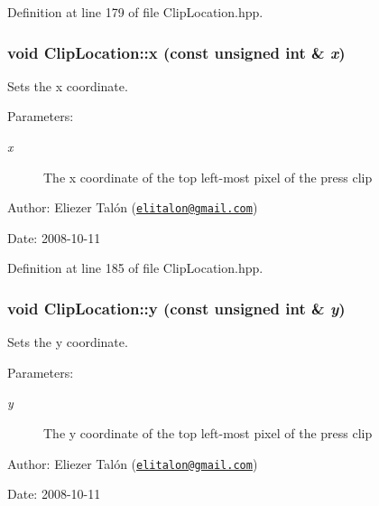 Definition at line 179 of file ClipLocation.hpp.\hypertarget{class_clip_location_f983f4cfe6ad80aa96cbbb4b53aec968}{
\subsubsection[x]{\setlength{\rightskip}{0pt plus 5cm}void ClipLocation::x (const unsigned int \& {\em x})}}
\label{class_clip_location_f983f4cfe6ad80aa96cbbb4b53aec968}


Sets the x coordinate. 

\begin{Desc}
\item[Parameters:]
\begin{description}
\item[{\em x}]The x coordinate of the top left-most pixel of the press clip\end{description}
\end{Desc}
\begin{Desc}
\item[Author:]Eliezer Talón (\href{mailto:elitalon@gmail.com}{\tt elitalon@gmail.com}) \end{Desc}
\begin{Desc}
\item[Date:]2008-10-11 \end{Desc}


Definition at line 185 of file ClipLocation.hpp.\hypertarget{class_clip_location_3c665324e5faf6bae4013d936f0ce2dc}{
\subsubsection[y]{\setlength{\rightskip}{0pt plus 5cm}void ClipLocation::y (const unsigned int \& {\em y})}}
\label{class_clip_location_3c665324e5faf6bae4013d936f0ce2dc}


Sets the y coordinate. 

\begin{Desc}
\item[Parameters:]
\begin{description}
\item[{\em y}]The y coordinate of the top left-most pixel of the press clip\end{description}
\end{Desc}
\begin{Desc}
\item[Author:]Eliezer Talón (\href{mailto:elitalon@gmail.com}{\tt elitalon@gmail.com}) \end{Desc}
\begin{Desc}
\item[Date:]2008-10-11 \end{Desc}


